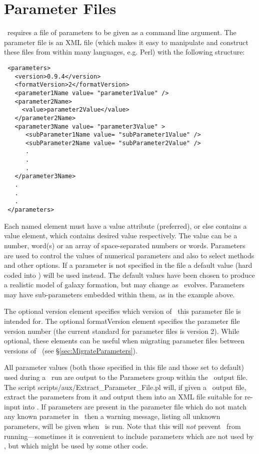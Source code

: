 \section{Parameter Files}\label{sec:ParameterFiles}

\glc\ requires a file of parameters to be given as a command line argument. The parameter file is an XML file (which makes it easy to manipulate and construct these files from within many languages, e.g. Perl) with the following structure:
\begin{verbatim}
 <parameters>
   <version>0.9.4</version>
   <formatVersion>2</formatVersion>
   <parameter1Name value= "parameter1Value" />
   <parameter2Name>
     <value>parameter2Value</value>
   </parameter2Name>
   <parameter3Name value= "parameter3Value" >
      <subParameter1Name value= "subParameter1Value" />
      <subParameter2Name value= "subParameter2Value" />
      .
      .
      .
   </parameter3Name>
   .
   .
   .
 </parameters>
\end{verbatim}
Each named element must have a {\normalfont \ttfamily value} attribute (preferred), or else contains a value element, which contains desired value respectively. The value can be a number, word(s) or an array of space-separated numbers or words. Parameters are used to control the values of numerical parameters and also to select methods and other options. If a parameter is not specified in the file a default value (hard coded into \glc) will be used instead. The default values have been chosen to produce a realistic model of galaxy formation, but may change as \glc\ evolves. Parameters may have sub-parameters embedded within them, as in the example above.

The optional {\normalfont \ttfamily version} element specifies which version of \glc\ this parameter file is intended for. The optional {\normalfont \ttfamily formatVersion} element specifies the parameter file version number (the current standard for parameter files is version 2). While optional, these elements can be useful when migrating parameter files between versions of \glc\ (see \S\ref{sec:MigrateParameters}).

All parameter values (both those specified in this file and those set to default) used during a \glc\ run are output to the {\normalfont \ttfamily Parameters} group within the \glc\ output file. The script {\normalfont \ttfamily scripts/aux/Extract\_Parameter\_File.pl} will, if given a \glc\ output file, extract the parameters from it and output them into an XML file suitable for re-input into \glc. If parameters are present in the parameter file which do not match any known parameter in \glc\ then a warning message, listing all unknown parameters, will be given when \glc\ is run. Note that this will \emph{not} prevent \glc\ from running---sometimes it is convenient to include parameters which are not used by \glc, but which might be used by some other code.

